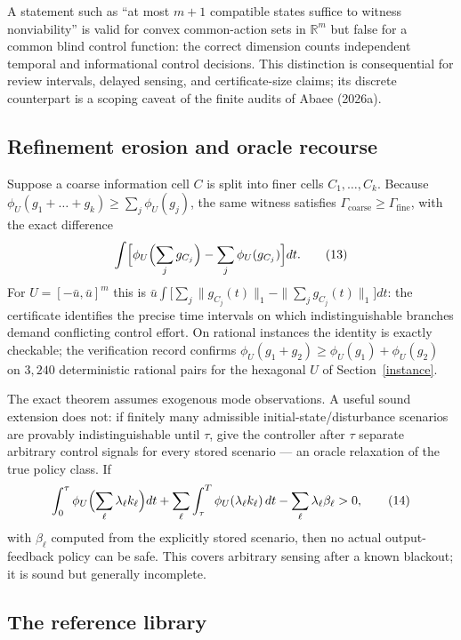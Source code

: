 \documentclass[10pt,twocolumn]{article}
\theoremstyle{plain}
\theoremstyle{definition}
\theoremstyle{remark}
\begin{document}
A statement such as ``at most \(m+1\) compatible states suffice to witness
nonviability'' is valid for convex common-action sets in \(\mathbb{R}^m\) but
false for a common blind control function: the correct dimension counts
independent temporal and informational control decisions. This distinction
is consequential for review intervals, delayed sensing, and
certificate-size claims; its discrete counterpart is a scoping caveat of the
finite audits of Abaee (2026a).

\subsection{Refinement erosion and oracle recourse}\label{erosion}

Suppose a coarse information cell \(C\) is split into finer cells
\(C_1,\dots,C_k\). Because
\(\phi_U(g_1 + \dots + g_k) \ge \sum_j \phi_U(g_j)\), the same witness
satisfies \(\Gamma_{\mathrm{coarse}} \ge \Gamma_{\mathrm{fine}}\), with the
exact difference
\[
\int \Bigl[ \phi_U\Bigl(\sum_j g_{C_j}\Bigr) - \sum_j \phi_U(g_{C_j}) \Bigr]
dt.
\tag{13}
\]
For \(U = [-\bar u, \bar u]^m\) this is
\(\bar u \int \bigl[\sum_j \|g_{C_j}(t)\|_1 - \|\sum_j g_{C_j}(t)\|_1\bigr] dt\):
the certificate identifies the precise time intervals on which
indistinguishable branches demand conflicting control effort. On rational
instances the identity is exactly checkable; the verification record confirms
\(\phi_U(g_1 + g_2) \ge \phi_U(g_1) + \phi_U(g_2)\) on \(3{,}240\)
deterministic rational pairs for the hexagonal \(U\) of
Section~\ref{instance}.

The exact theorem assumes exogenous mode observations. A useful sound
extension does not: if finitely many admissible initial-state/disturbance
scenarios are provably indistinguishable until \(\tau\), give the controller
after \(\tau\) separate arbitrary control signals for every stored scenario
--- an oracle relaxation of the true policy class. If
\[
\int_0^\tau \phi_U\Bigl(\sum_\ell \lambda_\ell k_\ell\Bigr) dt
+ \sum_\ell \int_\tau^T \phi_U(\lambda_\ell k_\ell)\, dt
- \sum_\ell \lambda_\ell \beta_\ell > 0,
\tag{14}
\]
with \(\beta_\ell\) computed from the explicitly stored scenario, then no
actual output-feedback policy can be safe. This covers arbitrary sensing
after a known blackout; it is sound but generally incomplete.

\subsection{The reference library}\label{library}
\end{document}
